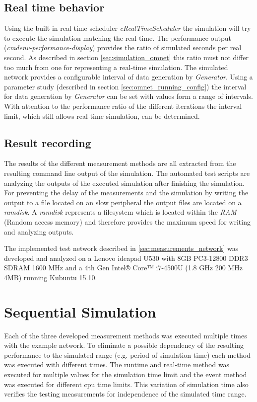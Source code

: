 \subsection{Real time behavior}
\label{sec:measurements_methods_realtime}
Using the built in real time scheduler \emph{cRealTimeScheduler} the simulation will try to execute the simulation matching the real time.
The performance output (\emph{cmdenv-performance-display}) provides the ratio of simulated seconds per real second.
As described in section \ref{sec:simulation_omnet} this ratio must not differ too much from one for representing a real-time simulation.
The simulated network provides a configurable interval of data generation by \emph{Generator}.
Using a parameter study (described in section \ref{sec:omnet_running_config}) the interval for data generation by \emph{Generator} can be set with values form a range of intervals.
With attention to the performance ratio of the different iterations the interval limit, which still allows real-time simulation, can be determined.

\subsection{Result recording}
The results of the different measurement methods are all extracted from the resulting command line output of the simulation.
The automated test scripts are analyzing the outputs of the executed simulation after finishing the simulation.
For preventing the delay of the measurements and the simulation by writing the output to a file located on an slow peripheral the output files are located on a \emph{ramdisk}.
A \emph{ramdisk} represents a filesystem which is located within the \emph{RAM} (Random access memory) and therefore provides the maximum speed for writing and analyzing outputs.

The implemented test network described in \ref{sec:measurements_network} was developed and analyzed on a Lenovo ideapad U530 with 8GB PC3-12800 DDR3 SDRAM 1600 MHz and a 4th Gen Intel® Core™ i7-4500U (1.8 GHz 200 MHz 4MB) running Kubuntu 15.10.
\cite{lenovo_spec}\\



\section{Sequential Simulation}
\label{sec:measurements_sequential}
Each of the three developed measurement methods was executed multiple times with the example network.
To eliminate a possible dependency of the resulting performance to the simulated range (e.g. period of simulation time) each method was executed with different times.
The runtime and real-time method was executed for multiple values for the simulation time limit and the event method was executed for different cpu time limits.
This variation of simulation time also verifies the testing measurements for independence of the simulated time range.

